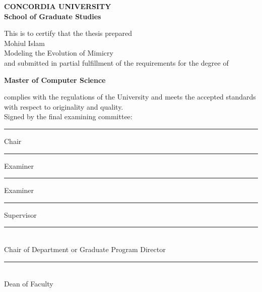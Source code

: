 \begin{titlepage}
\begin{center}
\Large \textbf{CONCORDIA UNIVERSITY}\\
\Large \textbf{School of Graduate Studies}\\[2cm]
\end{center}
This is to certify that the thesis prepared\\
 Mohiul Islam\\
  Modeling the Evolution of Mimicry\\
and submitted in partial fulfillment of the requirements for the degree of
\begin{center}
\small \textbf{Master of Computer Science}\\
\end{center}
complies with the regulations of the University and meets the accepted standards with respect to originality and quality.\\[1cm]
Signed by the final examining committee:\\

\begin{flushright}
\begin{minipage}{8cm}
\rule{5cm}{0.1mm} Chair\\[0.4cm]
\rule{5cm}{0.1mm} Examiner\\[0.4cm]
\rule{5cm}{0.1mm} Examiner\\[0.4cm]
\rule{5cm}{0.1mm} Supervisor\\[0.8cm]
\end{minipage}
\end{flushright}
 \rule{10cm}{0.1mm}\\ 
\makebox[4cm][l]{} Chair of Department or Graduate Program Director\\[1cm]
 \rule{10cm}{0.1mm}\\ 
\makebox[4cm][l]{} Dean of Faculty

\end{titlepage}